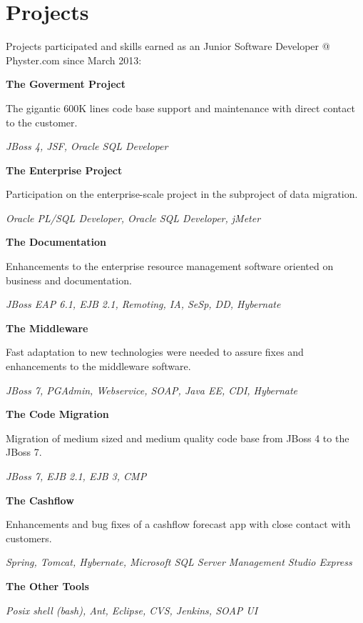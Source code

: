 \section{Projects}	
\bigskip

Projects participated and skills earned as an Junior Software Developer @ Physter.com since March 2013:\par
\bigskip

\textbf{The Goverment Project}\par
The gigantic 600K lines code base support and maintenance with direct contact to the customer.\par
\textit{JBoss 4, JSF, Oracle SQL Developer} \par
\bigskip

\textbf{The Enterprise Project}\par
Participation on the enterprise-scale project in the subproject of data migration.\par
\textit{Oracle PL/SQL Developer, Oracle SQL Developer, jMeter} \par
\bigskip

\textbf{The Documentation}\par
Enhancements to the enterprise resource management software oriented on business and documentation. \par
\textit{JBoss EAP 6.1, EJB 2.1, Remoting, IA, SeSp, DD, Hybernate} \par
\bigskip

\textbf{The Middleware}\par
Fast adaptation to new technologies were needed to assure fixes and enhancements to the middleware software. \par
\textit{JBoss 7, PGAdmin, Webservice, SOAP, Java EE, CDI, Hybernate} \par
\bigskip

\textbf{The Code Migration}\par
Migration of medium sized and medium quality code base from JBoss 4 to the JBoss 7.\par
\textit{JBoss 7, EJB 2.1, EJB 3, CMP}\par
\bigskip

\textbf{The Cashflow}\par
Enhancements and bug fixes of a cashflow forecast app with close contact with customers.\par
\textit{Spring, Tomcat, Hybernate, Microsoft SQL Server Management Studio Express}\par
\bigskip

\textbf{The Other Tools}\par
\textit{Posix shell (bash), Ant, Eclipse, CVS, Jenkins, SOAP UI}\par

